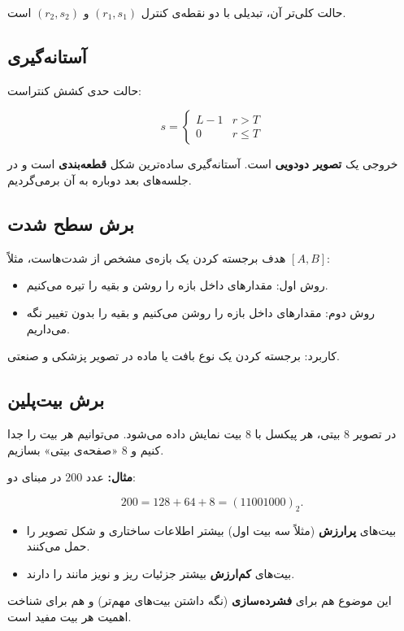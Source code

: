 \documentclass[11pt,a4paper]{article}
\begin{document}
	حالت کلی‌تر آن، تبدیلی با دو نقطه‌ی کنترل $(r_1,s_1)$ و $(r_2,s_2)$ است.
	
	\subsection{آستانه‌گیری}
	
	حالت حدی کشش کنتراست:
	
	\[
	s=
	\begin{cases}
		L-1 & r>T\\
		0 & r\leq T
	\end{cases}
	\]
	
	خروجی یک \textbf{تصویر دودویی} است. آستانه‌گیری ساده‌ترین شکل \textbf{قطعه‌بندی} است
	و در جلسه‌های بعد دوباره به آن برمی‌گردیم.
	
	\subsection{برش سطح شدت}
	
	هدف برجسته کردن یک بازه‌ی مشخص از شدت‌هاست، مثلاً $[A,B]$:
	
	\begin{itemize}
		\item روش اول: مقدارهای داخل بازه را روشن و بقیه را تیره می‌کنیم.
		\item روش دوم: مقدارهای داخل بازه را روشن می‌کنیم و بقیه را بدون تغییر نگه می‌داریم.
	\end{itemize}
	
	کاربرد: برجسته کردن یک نوع بافت یا ماده در تصویر پزشکی و صنعتی.
	
	\subsection{برش بیت‌پلین}
	
	در تصویر $8$ بیتی، هر پیکسل با $8$ بیت نمایش داده می‌شود. می‌توانیم هر بیت را جدا کنیم
	و $8$ «صفحه‌ی بیتی» بسازیم.
	
	\textbf{مثال:} عدد $200$ در مبنای دو:
	
	\[
	200=128+64+8=(11001000)_2.
	\]
	
	\begin{itemize}
		\item بیت‌های \textbf{پرارزش} (مثلاً سه بیت اول) بیشتر اطلاعات ساختاری و شکل تصویر را حمل می‌کنند.
		\item بیت‌های \textbf{کم‌ارزش} بیشتر جزئیات ریز و نویز مانند را دارند.
	\end{itemize}
	
	این موضوع هم برای \textbf{فشرده‌سازی} (نگه داشتن بیت‌های مهم‌تر) و هم برای
	شناخت اهمیت هر بیت مفید است.
	
\end{document}
